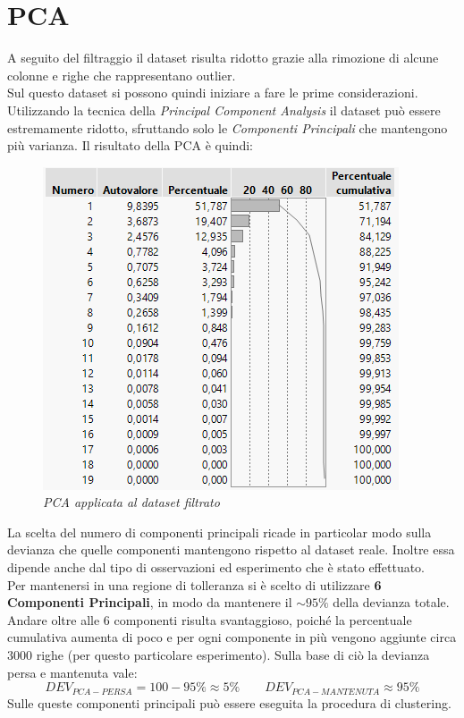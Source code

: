 \section{PCA}
A seguito del filtraggio il dataset risulta ridotto grazie alla rimozione di alcune colonne e righe che rappresentano outlier.
\\Sul questo dataset si possono quindi iniziare a fare le prime considerazioni.
\\Utilizzando la tecnica della \textit{Principal Component Analysis} il dataset può essere estremamente ridotto, sfruttando solo le \textit{Componenti Principali} che mantengono più varianza. Il risultato della PCA è quindi:
\begin{figure}[H]
	\centering
	\includegraphics{img/hw1/pca.png}
	\caption{\textit{PCA applicata al dataset filtrato}}
\end{figure}
La scelta del numero di componenti principali ricade in particolar modo sulla devianza che quelle componenti mantengono rispetto al dataset reale. Inoltre essa dipende anche dal tipo di osservazioni ed esperimento che è stato effettuato.
\\Per mantenersi in una regione di tolleranza si è scelto di utilizzare \textbf{6 Componenti Principali}, in modo da mantenere il $\sim95\%$ della devianza totale. Andare oltre alle 6 componenti risulta svantaggioso, poiché la percentuale cumulativa aumenta di poco e per ogni componente in più vengono aggiunte circa 3000 righe (per questo particolare esperimento). Sulla base di ciò la devianza persa e mantenuta vale:
\begin{equation*}
	DEV_{PCA-PERSA} = 100-95 \% \approx 5\% \qquad 	DEV_{PCA-MANTENUTA} \approx 95 \%
\end{equation*}
Sulle queste componenti principali può essere eseguita la procedura di clustering.

